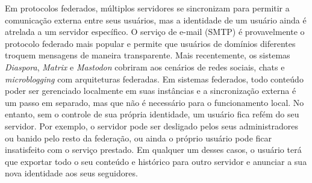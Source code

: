 \documentclass[12pt]{article}
\newcommand{\FC} {Freechains\xspace}
\begin{document}

Em protocolos federados, múltiplos servidores se sincronizam para permitir a
comunicação externa entre seus usuários, mas a identidade de um usuário ainda é
atrelada a um servidor específico.
O serviço de e-mail (SMTP) é provavelmente o protocolo federado mais popular e
permite que usuários de domínios diferentes troquem mensagens de maneira
transparente.
Mais recentemente, os sistemas \emph{Diaspora}, \emph{Matrix} e \emph{Mastodon}
cobriram aos cenários de redes sociais, chats e \emph{microblogging} com
arquiteturas federadas.
Em sistemas federados, todo conteúdo poder ser gerenciado localmente em suas
instâncias e a sincronização externa é um passo em separado, mas que não é
necessário para o funcionamento local.
No entanto, sem o controle de sua própria identidade, um usuário fica refém do
seu servidor.
Por exemplo, o servidor pode ser desligado pelos seus administradores ou banido
pelo resto da federação, ou ainda o próprio usuário pode ficar insatisfeito com
o serviço prestado.
Em qualquer um desses casos, o usuário terá que exportar todo o seu conteúdo e
histórico para outro servidor e anunciar a sua nova identidade aos seus
seguidores.
\end{document}
